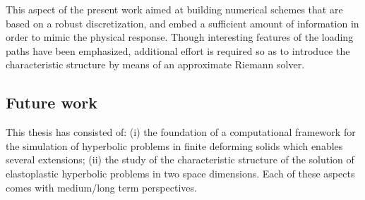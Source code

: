 This aspect of the present work aimed at building numerical schemes that are based on a robust discretization, and embed a sufficient amount of information in order to mimic the physical response.
Though interesting features of the loading paths have been emphasized, additional effort is required so as to introduce the characteristic structure by means of an approximate Riemann solver.


\subsection*{Future work}
This thesis has consisted of: (i) the foundation of a computational framework for the simulation of hyperbolic problems in finite deforming solids which enables several extensions; (ii) the study of the characteristic structure of the solution of elastoplastic hyperbolic problems in two space dimensions.
Each of these aspects comes with medium/long term perspectives.

